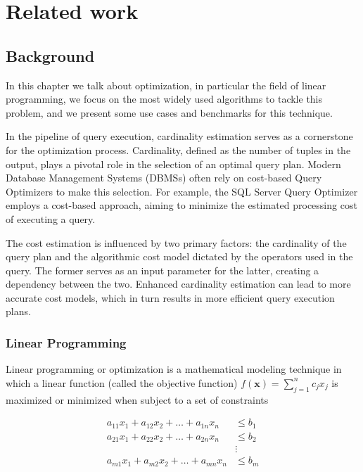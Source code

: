
\chapter{Related work}\label{chapter:relatedwork}

\section{Background}
In this chapter we talk about optimization, in particular the field
of linear programming, we focus on 
the  most widely used algorithms to tackle this problem,
and we present some use cases and benchmarks for this technique.

In the pipeline of query execution, cardinality estimation serves 
as a cornerstone for the optimization process. 
Cardinality, defined as the number of tuples in the output, 
plays a pivotal role in the selection of an optimal query plan. 
Modern Database Management Systems (DBMSs) often rely on 
cost-based Query Optimizers to make this selection. 
For example, the SQL Server Query Optimizer
 \parencite{microsoft2023cardinality} employs a 
 cost-based approach, aiming to minimize the estimated 
 processing cost of executing a query.

The cost estimation is influenced by two primary factors: 
the cardinality of the query plan and the algorithmic cost 
model dictated by the operators used in the query. The 
former serves as an input parameter for the latter, creating 
a dependency between the two. Enhanced cardinality estimation 
can lead to more accurate cost models, which in turn results 
in more efficient query execution plans.

  \subsection{Linear Programming}
  Linear programming or optimization is a mathematical modeling technique in which
  a linear function (called the objective function) $f(\mathbf{x}) = \sum_{j=1}^{n} c_j x_j$
  is maximized or minimized when subject to a set of constraints 
  
  \begin{align*}
  a_{11} x_1 + a_{12} x_2 + \dots + a_{1n} x_n &\leq b_1 \\
  a_{21} x_1 + a_{22} x_2 + \dots + a_{2n} x_n &\leq b_2 \\
  &\vdots \\
  a_{m1} x_1 + a_{m2} x_2 + \dots + a_{mn} x_n &\leq b_m \\
  \end{align*}
  
